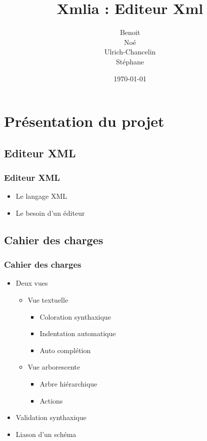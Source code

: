 \documentclass{beamer}
\title{Xmlia : Editeur Xml}
\author []{
\bsc{BOIVIN} Benoit\\
\bsc{LE PHILIPPE} Noé\\
\bsc{KEGBA-SANGO-SANGO} Ulrich-Chancelin\\
\bsc{WOUTERS} Stéphane
}
\institute{}
\date{\today}
\begin{document}
	\begin{frame}
		\titlepage
	\end{frame}

	\section{Présentation du projet}

  \subsection{Editeur XML}

  \begin{frame}
    \frametitle{Editeur XML}
     \begin{itemize}
      \item Le langage XML
      \pause
      \item Le besoin d'un éditeur
      \end{itemize}
  \end{frame}

	\subsection{Cahier des charges}

	\begin{frame}
		\frametitle{Cahier des charges}

    \begin{itemize}
    \item Deux vues
     \begin{itemize}
      \item Vue textuelle
       \pause
         \begin{itemize}
          \item Coloration synthaxique
          \pause
          \item Indentation automatique
          \pause
          \item Auto complétion
          \pause
          \end{itemize}
      \item Vue arborescente
      \pause
          \begin{itemize}
          \item Arbre hiérarchique
           \pause
          \item Actions
           \pause
          \end{itemize}
      \end{itemize}
    \item Validation synthaxique
    \item Liason d'un schéma
    \end{itemize}

	\end{frame}
\end{document}

